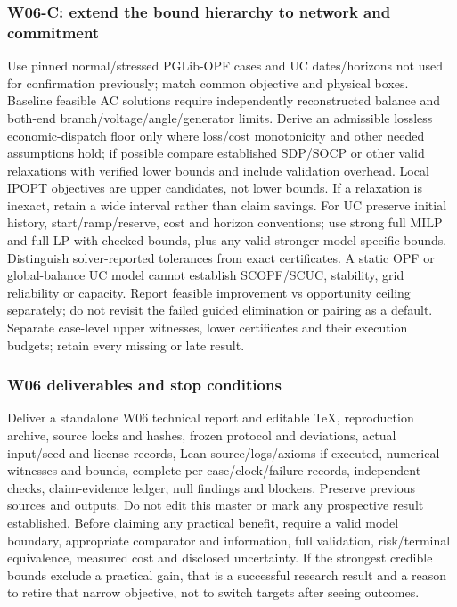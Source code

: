 \documentclass[11pt,letterpaper]{article}
\begin{document}
\subsubsection{W06-C: extend the bound hierarchy to network and commitment}
Use pinned normal/stressed PGLib-OPF cases and UC dates/horizons not used for confirmation previously; match common objective and physical boxes. Baseline feasible AC solutions require independently reconstructed balance and both-end branch/voltage/angle/generator limits. Derive an admissible lossless economic-dispatch floor only where loss/cost monotonicity and other needed assumptions hold; if possible compare established SDP/SOCP or other valid relaxations with verified lower bounds and include validation overhead. Local IPOPT objectives are upper candidates, not lower bounds. If a relaxation is inexact, retain a wide interval rather than claim savings. For UC preserve initial history, start/ramp/reserve, cost and horizon conventions; use strong full MILP and full LP with checked bounds, plus any valid stronger model-specific bounds. Distinguish solver-reported tolerances from exact certificates. A static OPF or global-balance UC model cannot establish SCOPF/SCUC, stability, grid reliability or capacity. Report feasible improvement vs opportunity ceiling separately; do not revisit the failed guided elimination or pairing as a default. Separate case-level upper witnesses, lower certificates and their execution budgets; retain every missing or late result.

\subsubsection{W06 deliverables and stop conditions}
Deliver a standalone W06 technical report and editable TeX, reproduction archive, source locks and hashes, frozen protocol and deviations, actual input/seed and license records, Lean source/logs/axioms if executed, numerical witnesses and bounds, complete per-case/clock/failure records, independent checks, claim-evidence ledger, null findings and blockers. Preserve previous sources and outputs. Do not edit this master or mark any prospective result established. Before claiming any practical benefit, require a valid model boundary, appropriate comparator and information, full validation, risk/terminal equivalence, measured cost and disclosed uncertainty. If the strongest credible bounds exclude a practical gain, that is a successful research result and a reason to retire that narrow objective, not to switch targets after seeing outcomes.
\end{document}
